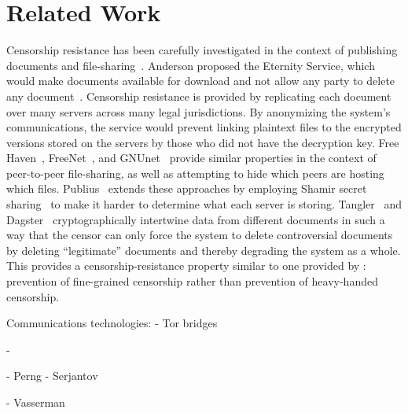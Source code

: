 \section{Related Work}

Censorship resistance has been carefully investigated in the context of
publishing documents and
file-sharing~\cite{eternity,freehaven,freenet,gnunet-esed,publius,tangler,dagster}.
Anderson proposed the Eternity Service, which would make documents
available for download and not allow any party to delete any
document~\cite{eternity}. Censorship resistance is provided by
replicating each document over many servers across many legal
jurisdictions. By anonymizing the system's communications, the service
would prevent linking plaintext files to the encrypted versions stored
on the servers by those who did not have the decryption key. Free
Haven~\cite{freehaven}, FreeNet~\cite{freenet}, and
GNUnet~\cite{gnunet-esed} provide similar properties in the context of
peer-to-peer file-sharing, as well as attempting to hide which peers are
hosting which files. Publius~\cite{publius} extends these approaches by
employing Shamir secret sharing~\cite{shamir} to make it harder to
determine what each server is storing. Tangler~\cite{tangler} and
Dagster~\cite{dagster} cryptographically intertwine data from different
documents in such a way that the censor can only force the system to
delete controversial documents by deleting ``legitimate'' documents and
thereby degrading the system as a whole. This provides a
censorship-resistance property similar to one provided by \hoot:
prevention of fine-grained censorship rather than prevention of
heavy-handed censorship.

Communications technologies:
- Tor bridges


- 




- Perng
- Serjantov

- Vasserman
